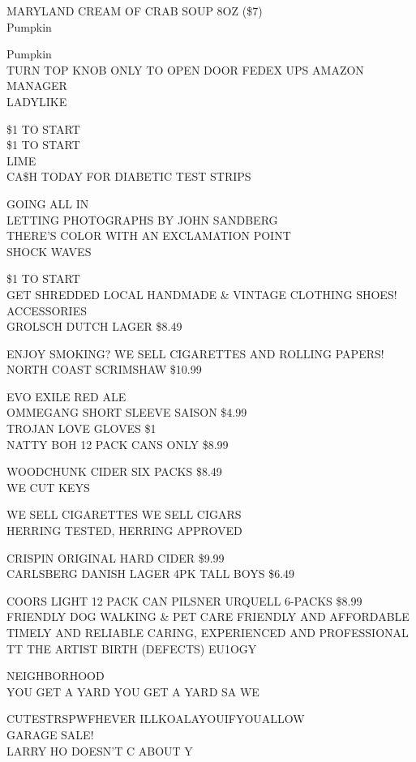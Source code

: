 \documentclass[10pt,letterpaper]{article}
\begin{document}
MARYLAND CREAM OF CRAB SOUP 8OZ (\$7)\\
Pumpkin

Pumpkin\\
TURN TOP KNOB ONLY TO OPEN DOOR FEDEX UPS AMAZON MANAGER\\
LADYLIKE

\$1 TO START\\
\$1 TO START\\
LIME\\
CA\$H TODAY FOR DIABETIC TEST STRIPS

GOING ALL IN\\
LETTING PHOTOGRAPHS BY JOHN SANDBERG\\
THERE'S COLOR WITH AN EXCLAMATION POINT\\
SHOCK WAVES

\$1 TO START\\
GET SHREDDED LOCAL HANDMADE \& VINTAGE CLOTHING SHOES! ACCESSORIES\\
GROLSCH DUTCH LAGER \$8.49

ENJOY SMOKING?  WE SELL CIGARETTES AND ROLLING PAPERS!\\
NORTH COAST SCRIMSHAW \$10.99

EVO EXILE RED ALE\\
OMMEGANG SHORT SLEEVE SAISON \$4.99\\
TROJAN LOVE GLOVES \$1\\
NATTY BOH 12 PACK CANS ONLY \$8.99

WOODCHUNK CIDER SIX PACKS \$8.49\\
WE CUT KEYS

WE SELL CIGARETTES WE SELL CIGARS\\
HERRING TESTED, HERRING APPROVED

CRISPIN ORIGINAL HARD CIDER \$9.99\\
CARLSBERG DANISH LAGER 4PK TALL BOYS \$6.49

COORS LIGHT 12 PACK CAN PILSNER URQUELL 6{-}PACKS \$8.99\\
FRIENDLY DOG WALKING \& PET CARE FRIENDLY AND AFFORDABLE TIMELY AND RELIABLE CARING, EXPERIENCED AND PROFESSIONAL\\
TT THE ARTIST BIRTH (DEFECTS) EU1OGY

NEIGHBORHOOD\\
YOU GET A YARD YOU GET A YARD SA WE

CUTESTRSPWFHEVER ILLKOALAYOUIFYOUALLOW\\
GARAGE SALE!\\
LARRY HO DOESN'T C ABOUT Y
\end{document}
